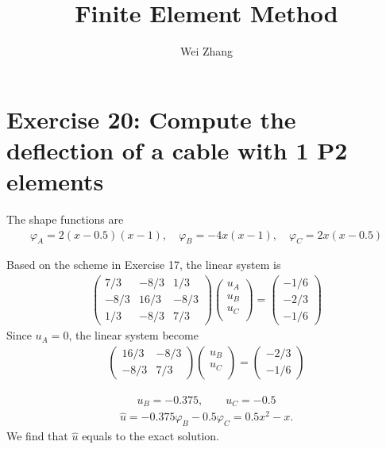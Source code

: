 \documentclass{article}
\begin{document}
\title{Finite Element Method}
\author{Wei Zhang}
\large
\maketitle
\section{Exercise 20: Compute the deflection of a cable with 1 P2 elements}
The shape functions are
\begin{gather*}
\varphi_{A}=2(x-0.5)(x-1), \quad  \varphi_{B}=-4x(x-1), \quad  \varphi_{C}=2x(x-0.5)
\end{gather*}

Based on the scheme in Exercise 17, the linear system is
\begin{gather*}
\begin{pmatrix}
7/3 & -8/3 &1/3\\
-8/3 & 16/3 &-8/3\\
1/3 &-8/3  &7/3
\end{pmatrix}
\begin{pmatrix}
u_{A}\\
u_{B}\\
u_{C}\\
\end{pmatrix}=
\begin{pmatrix}
-1/6\\
-2/3\\
-1/6
\end{pmatrix}
\end{gather*}
Since $u_{A}=0$, the linear system become
\begin{gather*}
\begin{pmatrix}
 16/3 &-8/3\\
-8/3  &7/3
\end{pmatrix}
\begin{pmatrix}
u_{B}\\
u_{C}\\
\end{pmatrix}=
\begin{pmatrix}
-2/3\\
-1/6
\end{pmatrix}
\end{gather*}

\begin{gather*}
u_{B}= -0.375, \qquad u_{C}= -0.5
\end{gather*}
\begin{gather*}
\hat{u}=-0.375\varphi_{B}-0.5\varphi_{C}=0.5x^{2}-x.
\end{gather*}
We find that $\hat{u}$ equals to the exact solution.
\end{document}
